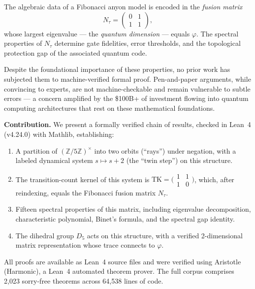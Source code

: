 \documentclass[11pt,a4paper]{article}
\newcommand{\Z}{\mathbb{Z}}
\begin{document}
The algebraic data of a Fibonacci anyon model is encoded in the
\emph{fusion matrix}
\begin{equation}\label{eq:Ntau}
  N_\tau = \begin{pmatrix} 0 & 1 \\ 1 & 1 \end{pmatrix},
\end{equation}
whose largest eigenvalue --- the \emph{quantum dimension} --- equals $\varphi$.
The spectral properties of $N_\tau$ determine gate fidelities, error thresholds,
and the topological protection gap of the associated quantum code.

Despite the foundational importance of these properties, no prior work has
subjected them to machine-verified formal proof. Pen-and-paper arguments,
while convincing to experts, are not machine-checkable and remain vulnerable
to subtle errors --- a concern amplified by the \$100B+ of investment flowing
into quantum computing architectures that rest on these mathematical foundations.

\medskip
\noindent\textbf{Contribution.}
We present a formally verified chain of results, checked in Lean~4 (v4.24.0)
with Mathlib, establishing:

\begin{enumerate}[label=(\roman*)]
  \item A partition of $(\Z/5\Z)^\times$ into two orbits (``rays'') under
        negation, with a labeled dynamical system $s \mapsto s + 2$
        (the ``twin step'') on this structure.
  \item The transition-count kernel of this system is
        $\mathrm{TK} = \bigl(\begin{smallmatrix} 1 & 1 \\ 1 & 0 \end{smallmatrix}\bigr)$,
        which, after reindexing, equals the Fibonacci fusion matrix $N_\tau$.
  \item Fifteen spectral properties of this matrix, including eigenvalue
        decomposition, characteristic polynomial, Binet's formula, and the
        spectral gap identity.
  \item The dihedral group $D_5$ acts on this structure, with a verified
        2-dimensional matrix representation whose trace connects to $\varphi$.
\end{enumerate}

All proofs are available as Lean~4 source files and were verified using
Aristotle (Harmonic), a Lean~4 automated theorem prover. The full corpus
comprises 2,023 sorry-free theorems across 64,538 lines of code.
\end{document}
